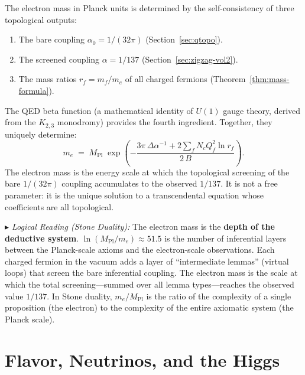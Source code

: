 \documentclass[11pt, a4paper, openany]{book}
\newcommand{\MPl}{M_{\mathrm{Pl}}}
\newcommand{\stoneref}[1]{%
  \smallskip\noindent
  {\small\color{structure!70}\textit{$\blacktriangleright$ Logical Reading
  (Stone Duality):} #1}%
  \smallskip}
\newcounter{thm}[chapter]
\begin{document}
\begin{theorem}
\label{thm:electron-mass}
The electron mass in Planck units is determined by the
self-consistency of three topological outputs:
\begin{enumerate}
  \item The bare coupling $\alpha_0 = 1/(32\pi)$
    (Section~\ref{sec:qtopo}).
  \item The screened coupling $\alpha = 1/137$
    (Section~\ref{sec:zigzag-vol2}).
  \item The mass ratios $r_f = m_f/m_e$ of all charged fermions
    (Theorem~\ref{thm:mass-formula}).
\end{enumerate}
The QED beta function (a mathematical identity of $U(1)$ gauge
theory, derived from the $K_{2,3}$ monodromy) provides the fourth
ingredient.  Together, they uniquely determine:
\begin{equation}
  m_e \;=\; \MPl \;\exp\!\left(
  -\frac{3\pi\,\Delta\alpha^{-1}
    + 2\!\sum_f N_c Q_f^2 \ln r_f}{2\,B}
  \right).
  \label{eq:me-absolute}
\end{equation}
The electron mass is the energy scale at which the topological
screening of the bare $1/(32\pi)$ coupling accumulates to the
observed $1/137$.  It is not a free parameter: it is the unique
solution to a transcendental equation whose coefficients are all
topological.
\end{theorem}

\stoneref{The electron mass is the \textbf{depth of the deductive
system}.  $\ln(\MPl/m_e) \approx 51.5$ is the number of
inferential layers between the Planck-scale axioms and the
electron-scale observations.  Each charged fermion in the vacuum
adds a layer of ``intermediate lemmas'' (virtual loops) that
screen the bare inferential coupling.  The electron mass is the
scale at which the total screening---summed over all lemma
types---reaches the observed value $1/137$.  In Stone duality,
$m_e/\MPl$ is the ratio of the complexity of a
single proposition (the electron) to the complexity of the
entire axiomatic system (the Planck scale).}


\chapter{Flavor, Neutrinos, and the Higgs}\label{ch:flavor}
\end{document}
